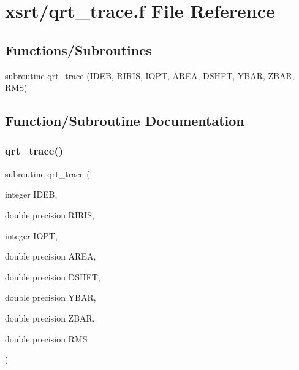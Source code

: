 \hypertarget{qrt__trace_8f}{}\section{xsrt/qrt\+\_\+trace.f File Reference}
\label{qrt__trace_8f}
\subsection*{Functions/\+Subroutines}
\begin{DoxyCompactItemize}
\item 
subroutine \hyperlink{qrt__trace_8f_a65184206fe59534a47ed091b7ca7ac06}{qrt\+\_\+trace} (I\+D\+EB, R\+I\+R\+IS, I\+O\+PT, A\+R\+EA, D\+S\+H\+FT, Y\+B\+AR, Z\+B\+AR, R\+MS)
\end{DoxyCompactItemize}


\subsection{Function/\+Subroutine Documentation}
\mbox{\label{qrt__trace_8f_a65184206fe59534a47ed091b7ca7ac06}} 
\subsubsection{\texorpdfstring{qrt\+\_\+trace()}{qrt\_trace()}}
{\footnotesize\ttfamily subroutine qrt\+\_\+trace (\begin{DoxyParamCaption}\item[{integer}]{I\+D\+EB,  }\item[{double precision}]{R\+I\+R\+IS,  }\item[{integer}]{I\+O\+PT,  }\item[{double precision}]{A\+R\+EA,  }\item[{double precision}]{D\+S\+H\+FT,  }\item[{double precision}]{Y\+B\+AR,  }\item[{double precision}]{Z\+B\+AR,  }\item[{double precision}]{R\+MS }\end{DoxyParamCaption})}

